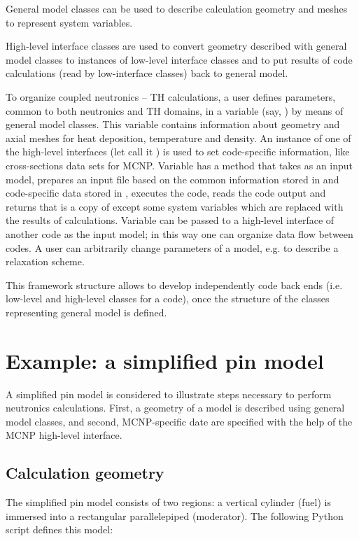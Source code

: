 \documentclass[a4paper,10pt,twocolumn,english]{sphinxsnamc2013}
\begin{document}
General model classes can be used to describe calculation geometry and
meshes to represent system variables.

High-level interface classes are used to convert geometry described with general
model classes to instances of low-level interface classes and to put results
of code calculations (read by low-interface classes) back to general model.

To organize coupled neutronics -- TH calculations, a user defines parameters, common to
both neutronics and TH domains, in a variable (say, ) by means of general model
classes. This variable contains information about geometry and axial
meshes for heat deposition, temperature and density. An instance of one of the
high-level interfaces (let call it ) is used to set
code-specific information, like cross-sections data sets for MCNP. Variable
 has a method that takes  as an input model, prepares an input file
based on the common information stored in  and code-specific data stored
in , executes the code, reads the code output and returns  that is
a copy of  except some system variables which are replaced with the results of
calculations. Variable  can be passed to a high-level interface of
another code as the input model; in this way one can organize data flow between
codes. A user can arbitrarily change parameters of a model, e.g. to describe a
relaxation scheme.

This framework structure allows to develop independently code back ends (i.e.
low-level and high-level classes for a code), once the structure of the classes
representing general model is defined.


\section{Example: a simplified pin model}
\label{paper:example-a-simplified-pin-model}
A simplified pin model is considered to illustrate steps necessary to perform
neutronics calculations. First, a geometry of a model is described using general model
classes, and second, MCNP-specific date are specified with the help of
the MCNP high-level interface.


\subsection{Calculation geometry}
\label{paper:calculation-geometry}
The simplified pin model consists of two regions: a vertical cylinder (fuel) is
immersed into a rectangular parallelepiped (moderator). The following Python
script defines this model:
\end{document}
